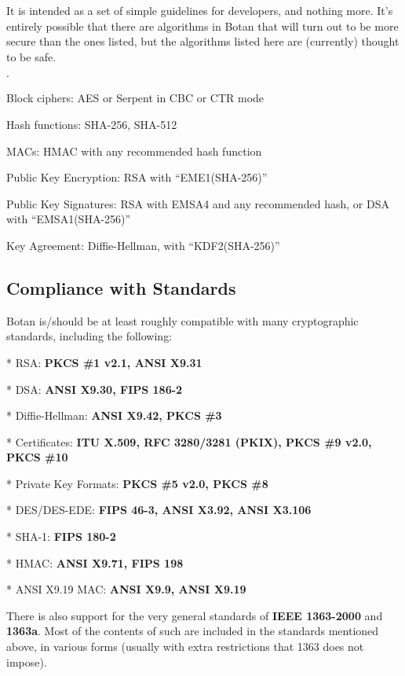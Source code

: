 \documentclass{article}
\begin{document}
It is intended as a set of simple guidelines for developers, and nothing more.
It's entirely possible that there are algorithms in Botan that will turn out to
be more secure than the ones listed, but the algorithms listed here are
(currently) thought to be safe.

\begin{list}{$\cdot$}
  \item Block ciphers: AES or Serpent in CBC or CTR mode

  \item Hash functions: SHA-256, SHA-512

  \item MACs: HMAC with any recommended hash function

  \item Public Key Encryption: RSA with ``EME1(SHA-256)''

  \item Public Key Signatures: RSA with EMSA4 and any recommended hash, or DSA
     with ``EMSA1(SHA-256)''

  \item Key Agreement: Diffie-Hellman, with ``KDF2(SHA-256)''
\end{list}

\subsection{Compliance with Standards}

Botan is/should be at least roughly compatible with many cryptographic
standards, including the following:

\newcommand{\standard}[2]{
   \vskip 4pt
   * #1: \textbf{#2}
}

\standard{RSA}{PKCS \#1 v2.1, ANSI X9.31}

\standard{DSA}{ANSI X9.30, FIPS 186-2}

\standard{Diffie-Hellman}{ANSI X9.42, PKCS \#3}

\standard{Certificates}{ITU X.509, RFC 3280/3281 (PKIX), PKCS \#9 v2.0,
PKCS \#10}

\standard{Private Key Formats}{PKCS \#5 v2.0, PKCS \#8}

\standard{DES/DES-EDE}{FIPS 46-3, ANSI X3.92, ANSI X3.106}

\standard{SHA-1}{FIPS 180-2}

\standard{HMAC}{ANSI X9.71, FIPS 198}

\standard{ANSI X9.19 MAC}{ANSI X9.9, ANSI X9.19}

\vskip 8pt
\noindent
There is also support for the very general standards of \textbf{IEEE 1363-2000}
and \textbf{1363a}. Most of the contents of such are included in the standards
mentioned above, in various forms (usually with extra restrictions that 1363
does not impose).
\end{document}
